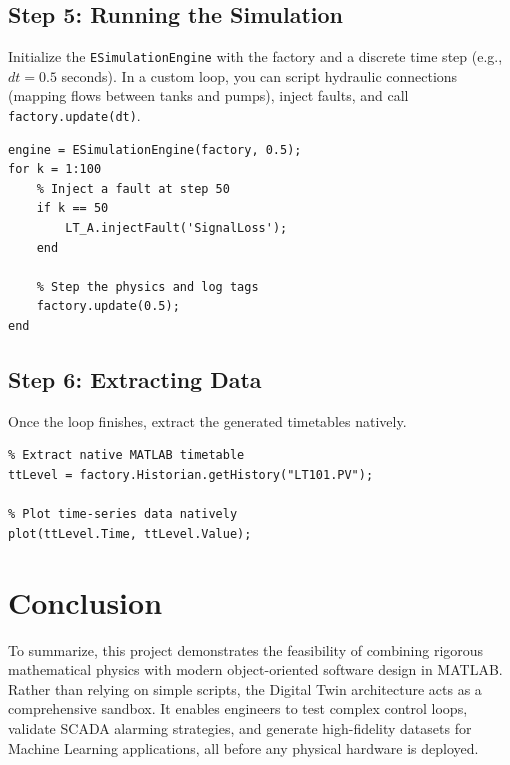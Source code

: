 \documentclass[11pt,a4paper]{report}
\begin{document}
\section{Step 5: Running the Simulation}
Initialize the \texttt{ESimulationEngine} with the factory and a discrete time step (e.g., $dt = 0.5$ seconds). In a custom loop, you can script hydraulic connections (mapping flows between tanks and pumps), inject faults, and call \texttt{factory.update(dt)}.
\begin{lstlisting}
engine = ESimulationEngine(factory, 0.5);
for k = 1:100
    % Inject a fault at step 50
    if k == 50
        LT_A.injectFault('SignalLoss');
    end
    
    % Step the physics and log tags
    factory.update(0.5);
end
\end{lstlisting}

\section{Step 6: Extracting Data}
Once the loop finishes, extract the generated timetables natively.
\begin{lstlisting}
% Extract native MATLAB timetable
ttLevel = factory.Historian.getHistory("LT101.PV");

% Plot time-series data natively
plot(ttLevel.Time, ttLevel.Value);
\end{lstlisting}

\chapter{Conclusion}
To summarize, this project demonstrates the feasibility of combining rigorous mathematical physics with modern object-oriented software design in MATLAB. Rather than relying on simple scripts, the Digital Twin architecture acts as a comprehensive sandbox. It enables engineers to test complex control loops, validate SCADA alarming strategies, and generate high-fidelity datasets for Machine Learning applications, all before any physical hardware is deployed.
\end{document}

